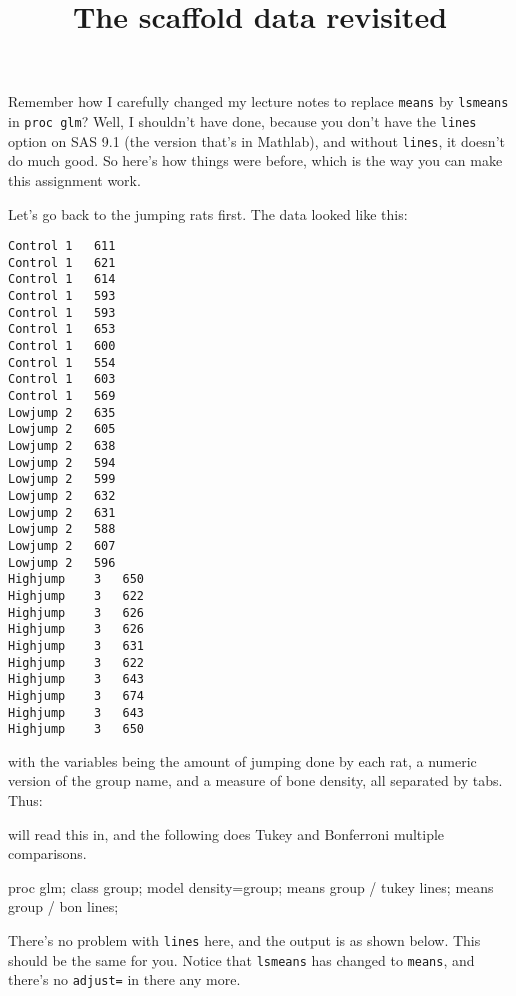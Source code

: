\documentclass{article}
\author{}
\title{The scaffold data revisited}
\begin{document}
\maketitle

Remember how I carefully changed my lecture notes to replace
\texttt{means} by \texttt{lsmeans} in \texttt{proc glm}? Well, I
shouldn't have done, because you don't have the \texttt{lines} option
on SAS 9.1 (the version that's in Mathlab), and without
\texttt{lines}, it doesn't do much good. So here's how things were
before, which is the way you can make this assignment work.

Let's go back to the jumping rats first. The data looked like this:


\begin{verbatim}
Control	1	611
Control	1	621
Control	1	614
Control	1	593
Control	1	593
Control	1	653
Control	1	600
Control	1	554
Control	1	603
Control	1	569
Lowjump	2	635
Lowjump	2	605
Lowjump	2	638
Lowjump	2	594
Lowjump	2	599
Lowjump	2	632
Lowjump	2	631
Lowjump	2	588
Lowjump	2	607
Lowjump	2	596
Highjump	3	650
Highjump	3	622
Highjump	3	626
Highjump	3	626
Highjump	3	631
Highjump	3	622
Highjump	3	643
Highjump	3	674
Highjump	3	643
Highjump	3	650
\end{verbatim}


with the variables being the amount of jumping done by each rat, a
numeric version of the group name, and a measure of bone density, all
separated by tabs. Thus:


will read this in, and the following does Tukey and Bonferroni
multiple comparisons.

\begin{Winput}
proc glm;
  class group;
  model density=group;
  means group / tukey lines;
  means group / bon lines;
\end{Winput}

There's no problem with \texttt{lines} here, and the output is as
shown below. This should be the same for you. Notice that
\texttt{lsmeans} has changed to \texttt{means}, and there's no
\texttt{adjust=} in there any more.
\end{document}
